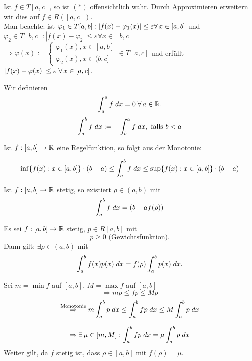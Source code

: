 \documentclass[../ana2.tex]{subfiles}
\begin{document}
\begin{bew}
    Ist \( f \in T[a,c] \), so ist \( (*) \) offensichtlich wahr.
    Durch Approximieren erweitern wir dies auf 
    \( f \in R([a,c]) \).\\
    Man beachte: ist \( \varphi_1 \in T[a,b]: \abs{f(x) - \varphi_1(x)} 
    \leq \varepsilon \forall x\in[a,b] \)
    und \( \varphi_2 \in T[b, c]: |f(x)-\varphi_2| \leq \varepsilon \forall x \in [b,c]\)    
    \( \Rightarrow \varphi(x) := \begin{cases}
        \varphi_1(x), x\in [a,b]\\
        \varphi_2(x), x \in (b,c]
    \end{cases} \in T[a,c] \) und erfüllt \( \abs{f(x) - \varphi(x)} \leq \varepsilon 
    \; \forall x \in [a,c] \).
\end{bew}
\begin{notation}
    Wir definieren
    \[ \integral{f}{a}{a} = 0 \;\forall a\in\R. \]
    \[ \integral{f}{a}{b} := - \integral{f}{b}{a}, \text{ falls } b < a \]
\end{notation}
\begin{bem}
    Ist \( \abb{f}{[a,b]}{\R} \) eine Regelfunktion,
    so folgt aus der Monotonie:
    
    \[ \inf \set{f(x): x\in[a,b]} \cdot (b-a) \leq \integral{f}{a}{b} 
    \leq \sup \set{f(x): x \in [a,b]} \cdot (b-a) \]
    
    Ist \( \abb{f}{[a,b]}{\R} \) stetig, so existiert 
    \( \rho \in (a,b) \) mit
    \[ \integral{f}{a}{b} = (b-af(\rho)) \]
\end{bem}
\begin{satz}
    Es sei \( \abb{f}{[a,b]}{\R} \) stetig, 
    \( p \in R[a,b] \) mit 
    \[ p \geq 0 \text{ (Gewichtsfunktion)}. \]
    Dann gilt: \( \exists \rho \in (a,b) \) mit 
    \[ \integral{f(x) p(x)}{a}{b} 
    = f(\rho) \integral{p(x)}{a}{b}. \]
\end{satz}
\begin{bew}
    Sei \( m = \min f \) auf \([a,b]\), \(M=\max f\) auf \([a,b]\)
    \[ \Rightarrow m p \leq f p \leq M p \]
    \[ \oversett{Monotonie}{\Rightarrow} m \integral{p}{a}{b}
    \leq \integral{fp}{a}{b} \leq M \integral{p}{a}{b}  \]

    \[ \Rightarrow \exists \mu \in [m,M]: 
    \integral{fp}{a}{b} = \mu \integral{p}{a}{b} \]
    Weiter gilt, da \(f\) stetig ist, dass 
    \(\rho \in [a,b]\) mit \( f(\rho) = \mu \).
\end{bew}
\end{document}
